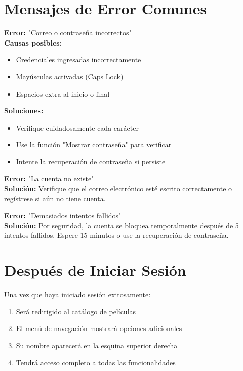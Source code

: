 \documentclass[11pt,a4paper,twoside]{book}
\begin{document}
\section{Mensajes de Error Comunes}

\begin{errorbox}
\textbf{Error:} "Correo o contraseña incorrectos"\\
\textbf{Causas posibles:}
\begin{itemize}
    \item Credenciales ingresadas incorrectamente
    \item Mayúsculas activadas (Caps Lock)
    \item Espacios extra al inicio o final
\end{itemize}
\textbf{Soluciones:}
\begin{itemize}
    \item Verifique cuidadosamente cada carácter
    \item Use la función "Mostrar contraseña" para verificar
    \item Intente la recuperación de contraseña si persiste
\end{itemize}
\end{errorbox}

\begin{errorbox}
\textbf{Error:} "La cuenta no existe"\\
\textbf{Solución:} Verifique que el correo electrónico esté escrito correctamente o regístrese si aún no tiene cuenta.
\end{errorbox}

\begin{errorbox}
\textbf{Error:} "Demasiados intentos fallidos"\\
\textbf{Solución:} Por seguridad, la cuenta se bloquea temporalmente después de 5 intentos fallidos. Espere 15 minutos o use la recuperación de contraseña.
\end{errorbox}

\section{Después de Iniciar Sesión}

Una vez que haya iniciado sesión exitosamente:

\begin{enumerate}
    \item Será redirigido al catálogo de películas
    \item El menú de navegación mostrará opciones adicionales
    \item Su nombre aparecerá en la esquina superior derecha
    \item Tendrá acceso completo a todas las funcionalidades
\end{enumerate}
\end{document}
